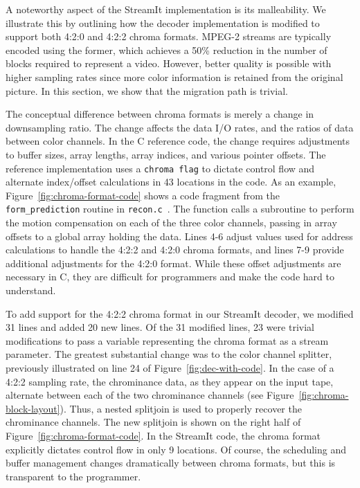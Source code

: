 \label{section:chroma}

A noteworthy aspect of the StreamIt implementation is its
malleability. We illustrate this by outlining how the decoder
implementation is modified to support both 4:2:0 and 4:2:2 chroma
formats. MPEG-2 streams are typically encoded using the former, which
achieves a 50\% reduction in the number of blocks required to
represent a video. However, better quality is possible with higher
sampling rates since more color information is retained from the
original picture. In this section, we show that the migration path is
trivial.

The conceptual difference between chroma formats is merely a change in
downsampling ratio. The change affects the data I/O rates, and the
ratios of data between color channels. In the C reference code, the
change requires adjustments to buffer sizes, array lengths, array
indices, and various pointer offsets. The reference implementation
uses a \texttt{chroma flag} to dictate control flow and alternate
index/offset calculations in 43 locations in the code. As an example,
Figure~\ref{fig:chroma-format-code} shows a code fragment from the
\texttt{form\_prediction} routine in
\texttt{recon.c}~\cite{reference-mpeg-c}. The function calls a
subroutine to perform the motion compensation on each of the three
color channels, passing in array offsets to a global array holding the
data. Lines 4-6 adjust values used for address calculations to handle
the 4:2:2 and 4:2:0 chroma formats, and lines 7-9 provide additional
adjustments for the 4:2:0 format. While these offset adjustments are
necessary in C, they are difficult for programmers and make the code
hard to understand.

To add support for the 4:2:2 chroma format in our StreamIt decoder, we
modified 31 lines and added 20 new lines. Of the 31 modified lines, 23
were trivial modifications to pass a variable representing the chroma
format as a stream parameter. The greatest substantial change was to
the color channel splitter, previously illustrated on line 24 of
Figure~\ref{fig:dec-with-code}. In the case of a 4:2:2 sampling rate,
the chrominance data, as they appear on the input tape, alternate
between each of the two chrominance channels (see
Figure~\ref{fig:chroma-block-layout}). Thus, a nested splitjoin is used
to properly recover the chrominance channels. The new splitjoin is
shown on the right half of Figure~\ref{fig:chroma-format-code}.  In
the StreamIt code, the chroma format explicitly dictates control flow
in only 9 locations. Of course, the scheduling and buffer management
changes dramatically between chroma formats, but this is transparent
to the programmer.

